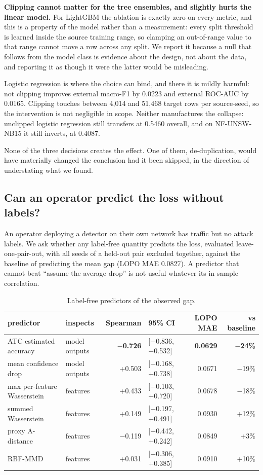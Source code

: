 \documentclass[journal]{IEEEtran}
\begin{document}
\textbf{Clipping cannot matter for the tree ensembles, and slightly hurts the linear model.} For LightGBM the ablation is exactly zero on every metric, and this is a property of the model rather than a measurement: every split threshold is learned inside the source training range, so clamping an out-of-range value to that range cannot move a row across any split. We report it because a null that follows from the model class is evidence about the design, not about the data, and reporting it as though it were the latter would be misleading.

Logistic regression is where the choice can bind, and there it is mildly harmful: not clipping improves external macro-F1 by 0.0223 and external ROC-AUC by 0.0165. Clipping touches between 4,014 and 51,468 target rows per source-seed, so the intervention is not negligible in scope. Neither manufactures the collapse: unclipped logistic regression still transfers at 0.5460 overall, and on NF-UNSW-NB15 it still inverts, at 0.4087.

None of the three decisions creates the effect. One of them, de-duplication, would have materially changed the conclusion had it been skipped, in the direction of understating what we found.

\subsection{Can an operator predict the loss without labels?}

An operator deploying a detector on their own network has traffic but no attack labels. We ask whether any label-free quantity predicts the loss, evaluated leave-one-pair-out, with all seeds of a held-out pair excluded together, against the baseline of predicting the mean gap (LOPO MAE 0.0827). A predictor that cannot beat ``assume the average drop'' is not useful whatever its in-sample correlation.

\begin{table}[htbp]\centering\scriptsize
\caption{Label-free predictors of the observed gap.}
\begin{tabular}{llrlrr}
\toprule
predictor & inspects & Spearman & 95\% CI & LOPO MAE & vs baseline \\
\midrule
ATC estimated accuracy & model outputs & \textbf{$-$0.726} & [$-$0.836, $-$0.532] & \textbf{0.0629} & \textbf{$-$24\%} \\
mean confidence drop & model outputs & +0.503 & [+0.168, +0.738] & 0.0671 & $-$19\% \\
max per-feature Wasserstein & features & +0.433 & [+0.103, +0.720] & 0.0678 & $-$18\% \\
summed Wasserstein & features & +0.149 & [$-$0.197, +0.491] & 0.0930 & +12\% \\
proxy A-distance & features & $-$0.119 & [$-$0.442, +0.242] & 0.0849 & +3\% \\
RBF-MMD & features & +0.031 & [$-$0.306, +0.385] & 0.0910 & +10\% \\
\bottomrule
\end{tabular}
\end{table}
\end{document}
